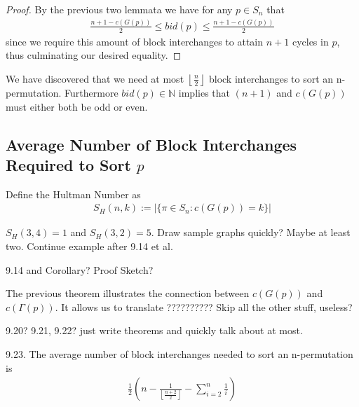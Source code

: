 \begin{proof}
By the previous two lemmata we have for any $p \in S_n$ that
\begin{align*}
\frac{n+1-c(G(p))}{2} \leq bid(p) \leq \frac{n+1-c(G(p))}{2}
\end{align*}
since we require this amount of block interchanges to attain $n+1$ cycles in $p$, thus culminating our desired equality.
\end{proof}

\begin{remark}
We have discovered that we need at most $\left \lfloor{\frac{n}{2}}\right \rfloor $ block interchanges to sort an n-permutation. Furthermore $bid(p) \in \mathbb{N}$ implies that $(n+1)$ and $c(G(p))$ must either both be odd or even.
\end{remark}


\subsection{Average Number of Block Interchanges Required to Sort $p$}

\begin{definition}
Define the Hultman Number as
\begin{align*}
S_H(n,k) := | \{ \pi \in S_n : c(G(p)) = k \} |
\end{align*}
\end{definition}

\begin{example}
$S_H(3,4) = 1$ and $S_H(3,2)=5$.
Draw sample graphs quickly? Maybe at least two.
Continue example after 9.14 et al.
\end{example}


\begin{theorem}
9.14 and Corollary? Proof Sketch?
\end{theorem}

\begin{remark}
The previous theorem illustrates the connection between $c(G(p))$ and $c(\Gamma (p))$. It allows us to translate ?????????? Skip all the other stuff, useless?
\end{remark}

\begin{theorem}
9.20? 9.21, 9.22? just write theorems and quickly talk about at most.
\end{theorem}

\begin{theorem}
9.23. The average number of block interchanges needed to sort an n-permutation is
\begin{align*}
\frac{1}{2} (n- \frac{1}{ \left \lfloor{\frac{n+2}{2}}\right \rfloor} - \sum^n_{i=2} \frac{1}{i} )
\end{align*}
\end{theorem}

\begin{appendix}


\end{appendix}

